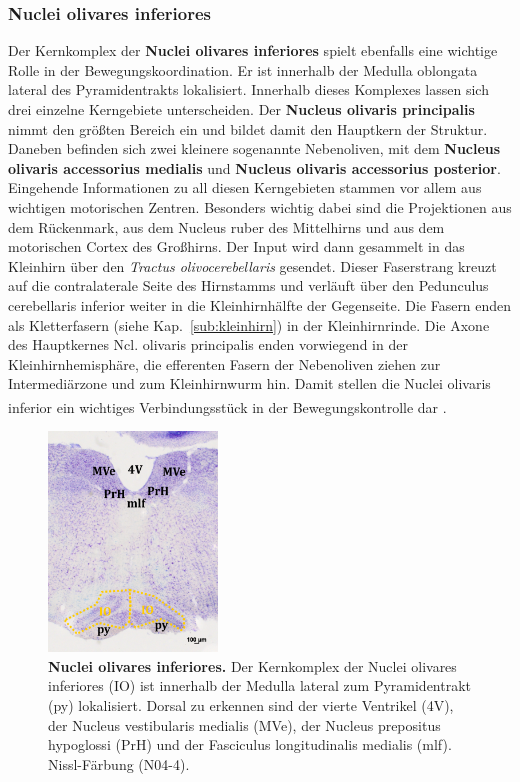 \subsubsection{Nuclei olivares inferiores}   \label{subsubsec:untere_olive}
Der Kernkomplex der \textbf{Nuclei olivares inferiores} spielt ebenfalls eine wichtige Rolle in der Bewegungskoordination. Er ist innerhalb der Medulla oblongata lateral des Pyramidentrakts lokalisiert. Innerhalb dieses Komplexes lassen sich drei einzelne Kerngebiete unterscheiden. Der \textbf{Nucleus olivaris principalis} nimmt den größten Bereich ein und bildet damit den Hauptkern der Struktur. Daneben befinden sich zwei kleinere sogenannte Nebenoliven, mit dem \textbf{Nucleus olivaris accessorius medialis} und \textbf{Nucleus olivaris accessorius posterior}. Eingehende Informationen zu all diesen Kerngebieten stammen vor allem aus wichtigen motorischen Zentren. Besonders wichtig dabei sind die Projektionen aus dem Rückenmark, aus dem Nucleus ruber des Mittelhirns und aus dem motorischen Cortex des Großhirns. Der Input wird dann gesammelt in das Kleinhirn über den \textit{Tractus olivocerebellaris} gesendet. Dieser Faserstrang kreuzt auf die contralaterale Seite des Hirnstamms und verläuft über den Pedunculus cerebellaris inferior weiter in die Kleinhirnhälfte der Gegenseite. Die Fasern enden als Kletterfasern (siehe Kap.~\ref{sub:kleinhirn}) in der Kleinhirnrinde. Die Axone des Hauptkernes Ncl. olivaris principalis enden vorwiegend in der Kleinhirnhemisphäre, die efferenten Fasern der Nebenoliven ziehen zur Intermediärzone und zum Kleinhirnwurm hin. Damit stellen die Nuclei olivaris inferior ein wichtiges Verbindungsstück in der Bewegungskontrolle dar \textsuperscript{\cite[Kap.~5]{trepel2011neuroanatomie}}.  

\begin{figure}[H]
    \centering
    \includegraphics[width=0.4\textwidth]{pictures/Bilder_Laura/untere_olive_N04_4.png}
    \caption[Nuclei olivares inferiores]{\textbf{Nuclei olivares inferiores.} Der Kernkomplex der Nuclei olivares inferiores (IO) ist innerhalb der Medulla lateral zum Pyramidentrakt (py) lokalisiert. Dorsal zu erkennen sind der vierte Ventrikel (4V), der Nucleus vestibularis medialis (MVe), der Nucleus prepositus hypoglossi (PrH) und der Fasciculus longitudinalis medialis (mlf). Nissl-Färbung (N04-4).}
    \label{fig:untere_olive}
\end{figure}
